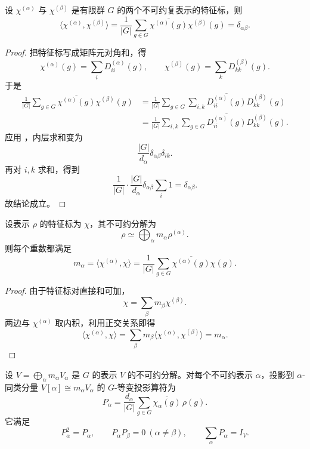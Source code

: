 \begin{theorem}[不可约特征标的正交关系]
设 $\chi^{(\alpha)}$ 与 $\chi^{(\beta)}$ 是有限群 $G$ 的两个不可约复表示的特征标，则
\[
\langle \chi^{(\alpha)},\chi^{(\beta)}\rangle
=\frac1{|G|}\sum_{g\in G}\overline{\chi^{(\alpha)}(g)}\chi^{(\beta)}(g)
=\delta_{\alpha\beta}.
\]
\label{thm:character-orthogonality}

\end{theorem}

\begin{proof}
把特征标写成矩阵元对角和，得
\[
\chi^{(\alpha)}(g)=\sum_i D^{(\alpha)}_{ii}(g),
\qquad
\chi^{(\beta)}(g)=\sum_k D^{(\beta)}_{kk}(g).
\]
于是
\begin{align*}
\frac1{|G|}\sum_{g\in G}\overline{\chi^{(\alpha)}(g)}\chi^{(\beta)}(g)
&=\frac1{|G|}\sum_{g\in G}\sum_{i,k}
\overline{D^{(\alpha)}_{ii}(g)}D^{(\beta)}_{kk}(g)\\
&=\frac1{|G|}\sum_{i,k}
\sum_{g\in G}\overline{D^{(\alpha)}_{ii}(g)}D^{(\beta)}_{kk}(g).
\end{align*}
应用 ，内层求和变为
\[
\frac{|G|}{d_\alpha}\delta_{\alpha\beta}\delta_{ik}.
\]
再对 $i,k$ 求和，得到
\[
\frac1{|G|}\cdot \frac{|G|}{d_\alpha}\delta_{\alpha\beta}\sum_i 1
=\delta_{\alpha\beta}.
\]
故结论成立。
\end{proof}

\begin{corollary}[重数公式]
设表示 $\rho$ 的特征标为 $\chi$，其不可约分解为
\[
\rho\simeq \bigoplus_\alpha m_\alpha \rho^{(\alpha)}.
\]
则每个重数都满足
\[
m_\alpha=\langle \chi^{(\alpha)},\chi\rangle
=\frac1{|G|}\sum_{g\in G}\overline{\chi^{(\alpha)}(g)}\chi(g).
\]
\label{cor:multiplicity-formula}

\end{corollary}

\begin{proof}
由于特征标对直接和可加，
\[
\chi=\sum_\beta m_\beta \chi^{(\beta)}.
\]
两边与 $\chi^{(\alpha)}$ 取内积，利用正交关系即得
\[
\langle \chi^{(\alpha)},\chi\rangle
=\sum_\beta m_\beta\langle \chi^{(\alpha)},\chi^{(\beta)}\rangle
=m_\alpha.
\]
\end{proof}

\begin{proposition}[投影算符的显式公式]
\label{prop:projection-operator}
设 $V=\bigoplus_\alpha m_\alpha V_\alpha$ 是 $G$ 的表示 $V$ 的不可约分解。对每个不可约表示 $\alpha$，投影到 $\alpha$-同类分量 $V[\alpha]\cong m_\alpha V_\alpha$ 的 $G$-等变投影算符为
\begin{equation}
P_\alpha=\frac{d_\alpha}{|G|}\sum_{g\in G}\overline{\chi_\alpha(g)}\,\rho(g).
\label{eq:projection-operator}
\end{equation}
它满足
\[
P_\alpha^2=P_\alpha,\qquad P_\alpha P_\beta=0\ (\alpha\neq\beta),\qquad\sum_\alpha P_\alpha=I_V.
\]

\end{proposition}

